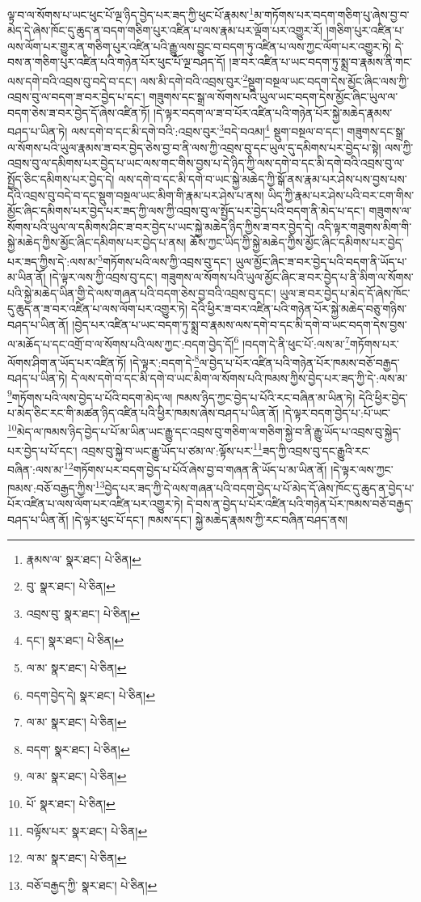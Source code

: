 ལྟ་བ་ལ་སོགས་པ་ཡང་ཕུང་པོ་ལྔ་ཉིད་བྱེད་པར་ཟད་ཀྱི་ཕུང་པོ་རྣམས་\footnote{རྣམས་ལ་  སྣར་ཐང་།  པེ་ཅིན། }མ་གཏོགས་པར་བདག་གཅིག་པུ་ཞེས་བྱ་བ་མེད་དེ་ཞེས་ཁོང་དུ་ཆུད་ན་བདག་གཅིག་པུར་འཛིན་པ་ལས་རྣམ་པར་ལྡོག་པར་འགྱུར་རོ། །གཅིག་པུར་འཛིན་པ་ལས་ལོག་པར་གྱུར་ན་གཅིག་པུར་འཛིན་པའི་རྒྱུ་ལས་བྱུང་བ་བདག་ཏུ་འཛིན་པ་ལས་ཀྱང་ལོག་པར་འགྱུར་ཏེ། དེ་བས་ན་གཅིག་པུར་འཛིན་པའི་གཉེན་པོར་ཕུང་པོ་ལྔ་བཤད་དོ། །ཟ་བར་འཛིན་པ་ཡང་བདག་ཏུ་སྨྲ་བ་རྣམས་ནི་གང་ལས་དགེ་བའི་འབྲས་བུ་བདེ་བ་དང་། ལས་མི་དགེ་བའི་འབྲས་བུར་\footnote{བུ་  སྣར་ཐང་།  པེ་ཅིན། }སྡུག་བསྔལ་ཡང་བདག་དེས་མྱོང་ཞིང་ལས་ཀྱི་འབྲས་བུ་ལ་བདག་ཟ་བར་བྱེད་པ་དང་། གཟུགས་དང་སྒྲ་ལ་སོགས་པའི་ཡུལ་ཡང་བདག་དེས་མྱོང་ཞིང་ཡུལ་ལ་བདག་ཅེས་ཟ་བར་བྱེད་དོ་ཞེས་འཛིན་ཏོ། །དེ་ལྟར་བདག་ལ་ཟ་བ་པོར་འཛིན་པའི་གཉེན་པོར་སྐྱེ་མཆེད་རྣམས་བཤད་པ་ཡིན་ཏེ། ལས་དགེ་བ་དང་མི་དགེ་བའི་:འབྲས་བུར་\footnote{འབྲས་བུ་  སྣར་ཐང་།  པེ་ཅིན། }བདེ་བའམ།\footnote{དང་།  སྣར་ཐང་།  པེ་ཅིན། } སྡུག་བསྔལ་བ་དང་། གཟུགས་དང་སྒྲ་ལ་སོགས་པའི་ཡུལ་རྣམས་ཟ་བར་བྱེད་ཅེས་བྱ་བ་ནི་ལས་ཀྱི་འབྲས་བུ་དང་ཡུལ་དུ་དམིགས་པར་བྱེད་པ་སྟེ། ལས་ཀྱི་འབྲས་བུ་ལ་དམིགས་པར་བྱེད་པ་ཡང་ལས་གང་གིས་བྱས་པ་དེ་ཉིད་ཀྱི་ལས་དགེ་བ་དང་མི་དགེ་བའི་འབྲས་བུ་ལ་སྤྱོད་ཅིང་དམིགས་པར་བྱེད་དེ། ལས་དགེ་བ་དང་མི་དགེ་བ་ཡང་སྐྱེ་མཆེད་ཀྱི་སྒོ་ནས་རྣམ་པར་ཤེས་པས་བྱས་པས་དེའི་འབྲས་བུ་བདེ་བ་དང་སྡུག་བསྔལ་ཡང་མིག་གི་རྣམ་པར་ཤེས་པ་ནས། ཡིད་ཀྱི་རྣམ་པར་ཤེས་པའི་བར་ངག་གིས་མྱོང་ཞིང་དམིགས་པར་བྱེད་པར་ཟད་ཀྱི་ལས་ཀྱི་འབྲས་བུ་ལ་སྤྱོད་པར་བྱེད་པའི་བདག་ནི་མེད་པ་དང་། གཟུགས་ལ་སོགས་པའི་ཡུལ་ལ་དམིགས་ཤིང་ཟ་བར་བྱེད་པ་ཡང་སྐྱེ་མཆེད་ཉིད་ཀྱིས་ཟ་བར་བྱེད་དེ། འདི་ལྟར་གཟུགས་མིག་གི་སྐྱེ་མཆེད་ཀྱིས་མྱོང་ཞིང་དམིགས་པར་བྱེད་པ་ནས། ཆོས་ཀྱང་ཡིད་ཀྱི་སྐྱེ་མཆེད་ཀྱིས་མྱོང་ཞིང་དམིགས་པར་བྱེད་པར་ཟད་ཀྱིས་དེ་:ལས་མ་\footnote{ལ་མ་  སྣར་ཐང་།  པེ་ཅིན། }གཏོགས་པའི་ལས་ཀྱི་འབྲས་བུ་དང་། ཡུལ་མྱོང་ཞིང་ཟ་བར་བྱེད་པའི་བདག་ནི་ཡོད་པ་མ་ཡིན་ནོ། །དེ་ལྟར་ལས་ཀྱི་འབྲས་བུ་དང་། གཟུགས་ལ་སོགས་པའི་ཡུལ་མྱོང་ཞིང་ཟ་བར་བྱེད་པ་ནི་མིག་ལ་སོགས་པའི་སྐྱེ་མཆེད་ཡིན་གྱི་དེ་ལས་གཞན་པའི་བདག་ཅེས་བྱ་བའི་འབྲས་བུ་དང་། ཡུལ་ཟ་བར་བྱེད་པ་མེད་དོ་ཞེས་ཁོང་དུ་ཆུད་ན་ཟ་བར་འཛིན་པ་ལས་ལོག་པར་འགྱུར་ཏེ། དེའི་ཕྱིར་ཟ་བར་འཛིན་པའི་གཉེན་པོར་སྐྱེ་མཆེད་བཅུ་གཉིས་བཤད་པ་ཡིན་ནོ། །བྱེད་པར་འཛིན་པ་ཡང་བདག་ཏུ་སྨྲ་བ་རྣམས་ལས་དགེ་བ་དང་མི་དགེ་བ་ཡང་བདག་དེས་བྱས་ལ་མཆོད་པ་དང་འགྲོ་བ་ལ་སོགས་པའི་ལས་ཀྱང་:བདག་བྱེད་དོ།\footnote{བདག་བྱེད་དེ།  སྣར་ཐང་།  པེ་ཅིན། } །བདག་དེ་ནི་ཕུང་པོ་:ལས་མ་\footnote{ལ་མ་  སྣར་ཐང་།  པེ་ཅིན། }གཏོགས་པར་ལོགས་ཤིག་ན་ཡོད་པར་འཛིན་ཏོ། །དེ་ལྟར་:བདག་དེ་\footnote{བདག་  སྣར་ཐང་།  པེ་ཅིན། }ལ་བྱེད་པ་པོར་འཛིན་པའི་གཉེན་པོར་ཁམས་བཅོ་བརྒྱད་བཤད་པ་ཡིན་ཏེ། དེ་ལས་དགེ་བ་དང་མི་དགེ་བ་ཡང་མིག་ལ་སོགས་པའི་ཁམས་ཀྱིས་བྱེད་པར་ཟད་ཀྱི་དེ་:ལས་མ་\footnote{ལ་མ་  སྣར་ཐང་།  པེ་ཅིན། }གཏོགས་པའི་ལས་བྱེད་པ་པོའི་བདག་མེད་ལ། ཁམས་ཉིད་ཀྱང་བྱེད་པ་པོའི་རང་བཞིན་མ་ཡིན་ཏེ། དེའི་ཕྱིར་བྱེད་པ་མེད་ཅིང་རང་གི་མཚན་ཉིད་འཛིན་པའི་ཕྱིར་ཁམས་ཞེས་བཤད་པ་ཡིན་ནོ། །དེ་ལྟར་བདག་བྱེད་པ་:པོ་ཡང་\footnote{པོ་  སྣར་ཐང་།  པེ་ཅིན། }མེད་ལ་ཁམས་ཉིད་བྱེད་པ་པོ་མ་ཡིན་ཡང་རྒྱུ་དང་འབྲས་བུ་གཅིག་ལ་གཅིག་སྐྱེ་བ་ནི་རྒྱུ་ཡོད་པ་འབྲས་བུ་སྐྱེད་པར་བྱེད་པ་པོ་དང་། འབྲས་བུ་སྐྱེ་བ་ཡང་རྒྱུ་ཡོད་པ་ཙམ་ལ་:ལྟོས་པར་\footnote{བལྟོས་པར་  སྣར་ཐང་།  པེ་ཅིན། }ཟད་ཀྱི་འབྲས་བུ་དང་རྒྱུའི་རང་བཞིན་:ལས་མ་\footnote{ལ་མ་  སྣར་ཐང་།  པེ་ཅིན། }གཏོགས་པར་བདག་བྱེད་པ་པོའོ་ཞེས་བྱ་བ་གཞན་ནི་ཡོད་པ་མ་ཡིན་ནོ། །དེ་ལྟར་ལས་ཀྱང་ཁམས་:བཅོ་བརྒྱད་ཀྱིས་\footnote{བཅོ་བརྒྱད་ཀྱི་  སྣར་ཐང་།  པེ་ཅིན། }བྱེད་པར་ཟད་ཀྱི་དེ་ལས་གཞན་པའི་བདག་བྱེད་པ་པོ་མེད་དོ་ཞེས་ཁོང་དུ་ཆུད་ན་བྱེད་པ་པོར་འཛིན་པ་ལས་ལོག་པར་འཛིན་པར་འགྱུར་ཏེ། དེ་བས་ན་བྱེད་པ་པོར་འཛིན་པའི་གཉེན་པོར་ཁམས་བཅོ་བརྒྱད་བཤད་པ་ཡིན་ནོ། །དེ་ལྟར་ཕུང་པོ་དང་། ཁམས་དང་། སྐྱེ་མཆེད་རྣམས་ཀྱི་རང་བཞིན་བཤད་ནས། 